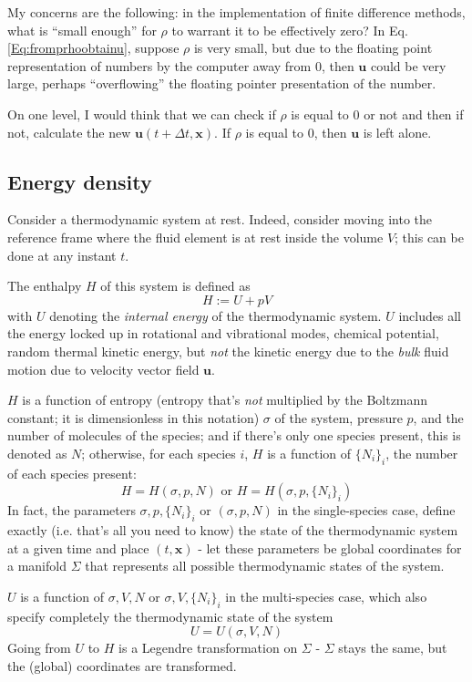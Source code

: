 \documentclass[10pt]{amsart}
\begin{document}
\begin{multicols*}{2}
My concerns are the following: in the implementation of finite difference methods, what is ``small enough'' for $\rho$ to warrant it to be effectively zero?  In Eq. \ref{Eq:fromprhoobtainu}, suppose $\rho$ is very small, but due to the floating point representation of numbers by the computer away from $0$, then $\mathbf{u}$ could be very large, perhaps ``overflowing'' the floating pointer presentation of the number.

On one level, I would think that we can check if $\rho$ is equal to $0$ or not and then if not, calculate the new $\mathbf{u}(t+\Delta t, \mathbf{x})$.  If $\rho$ is equal to $0$, then $\mathbf{u}$ is left alone.  

\subsection{Energy density}

Consider a thermodynamic system at rest.  Indeed, consider moving into the reference frame where the fluid element is at rest inside the volume $V$; this can be done at any instant $t$.

The enthalpy $H$ of this system is defined as
\begin{equation}
H := U + pV
  \end{equation}
with $U$ denoting the \emph{internal energy} of the thermodynamic system.  $U$ includes all the energy locked up in rotational and vibrational modes, chemical potential, random thermal kinetic energy, but \emph{not} the kinetic energy due to the \emph{bulk} fluid motion due to velocity vector field $\mathbf{u}$.

$H$ is a function of entropy (entropy that's \emph{not} multiplied by the Boltzmann constant; it is dimensionless in this notation) $\sigma$ of the system, pressure $p$, and the number of molecules of the species; and if there's only one species present, this is denoted as $N$; otherwise, for each species $i$, $H$ is a function of $\lbrace N_i\rbrace_i$, the number of each species present:
\[
H = H(\sigma,p,N) \text{ or } H = H(\sigma, p , \lbrace N_i \rbrace_i )
\]
In fact, the parameters $\sigma,p,\lbrace N_i \rbrace_i$ or $(\sigma,p,N)$ in the single-species case, define exactly (i.e. that's all you need to know) the state of the thermodynamic system at a given time and place $(t,\mathbf{x})$ - let these parameters be global coordinates for a manifold $\Sigma$ that represents all possible thermodynamic states of the system.

$U$ is a function of $\sigma,V,N$ or $\sigma, V,\lbrace N_i \rbrace_i$ in the multi-species case, which also specify completely the thermodynamic state of the system
\[
U = U(\sigma,V,N)
\]
Going from $U$ to $H$ is a Legendre transformation on $\Sigma$ - $\Sigma$ stays the same, but the (global) coordinates are transformed.


\end{multicols*}
\end{document}
